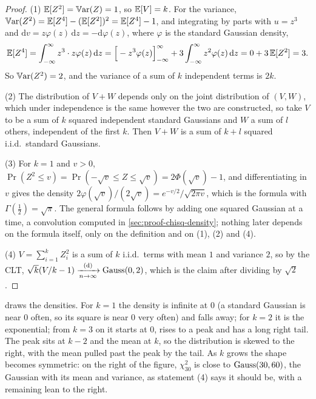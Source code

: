 \begin{proof}
(1) $\operatorname*{\mathbb{E}}[Z^2] = \operatorname*{\mathbb{V}\text{ar}}(Z) = 1$, so $\operatorname*{\mathbb{E}}[V] = k$.
For the variance, $\operatorname*{\mathbb{V}\text{ar}}(Z^2) = \operatorname*{\mathbb{E}}[Z^4] - (\operatorname*{\mathbb{E}}[Z^2])^2 = \operatorname*{\mathbb{E}}[Z^4] - 1$, and integrating by parts with $u = z^3$ and $\mathrm{d}v = z\varphi(z)\,\mathrm{d}z = -\mathrm{d}\varphi(z)$, where $\varphi$ is the standard Gaussian density,
\[
\operatorname*{\mathbb{E}}[Z^4] = \int_{-\infty}^{\infty} z^3 \cdot z\varphi(z)\,\mathrm{d}z = \Big[-z^3\varphi(z)\Big]_{-\infty}^{\infty} + 3\int_{-\infty}^{\infty} z^2\varphi(z)\,\mathrm{d}z = 0 + 3\operatorname*{\mathbb{E}}[Z^2] = 3.
\]
So $\operatorname*{\mathbb{V}\text{ar}}(Z^2) = 2$, and the variance of a sum of $k$ independent terms is $2k$.

(2) The distribution of $V + W$ depends only on the joint distribution of $(V, W)$, which under independence is the same however the two are constructed, so take $V$ to be a sum of $k$ squared independent standard Gaussians and $W$ a sum of $l$ others, independent of the first $k$. Then $V + W$ is a sum of $k + l$ squared i.i.d.\ standard Gaussians.

(3) For $k = 1$ and $v > 0$, $\Pr(Z^2 \leq v) = \Pr(-\sqrt{v} \leq Z \leq \sqrt{v}) = 2\Phi(\sqrt{v}) - 1$, and differentiating in $v$  gives the density $2\varphi(\sqrt{v})/(2\sqrt{v}) = e^{-v/2}/\sqrt{2\pi v}$, which is the formula with $\Gamma(\frac12) = \sqrt{\pi}$.
The general formula follows by adding one squared Gaussian at a time, a convolution computed in \cref{sec:proof-chisq-density}; nothing later depends on the formula itself, only on the definition and on (1), (2) and (4).

(4) $V = \sum_{i=1}^k Z_i^2$ is a sum of $k$ i.i.d.\ terms with mean $1$ and variance $2$, so by the CLT, $\sqrt{k}(V/k - 1) \xrightarrow [n \to \infty ]{\text{(d)}} \text{Gauss}(0, 2)$, which is the claim after dividing by $\sqrt{2}$.
\end{proof}

 draws the densities.
For $k = 1$ the density is infinite at $0$ (a standard Gaussian is near $0$ often, so its square is near $0$ very often) and falls away; for $k = 2$ it is the exponential; from $k = 3$ on it starts at $0$, rises to a peak and has a long right tail.
The peak sits at $k - 2$ and the mean at $k$, so the distribution is skewed to the right, with the mean pulled past the peak by the tail.
As $k$ grows the shape becomes symmetric: on the right of the figure, $\chi^2_{30}$ is close to $\text{Gauss}(30, 60)$, the Gaussian with its mean and variance, as statement (4) says it should be, with a remaining lean to the right.

